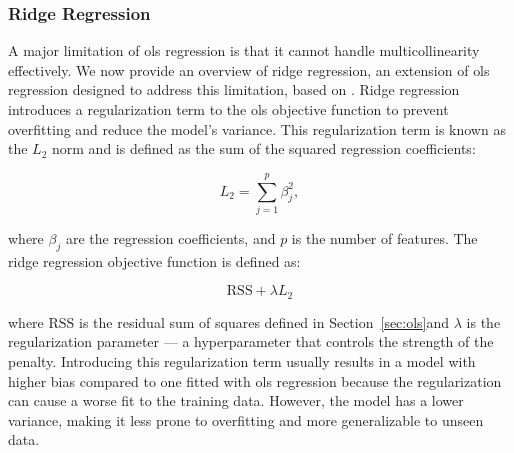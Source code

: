\subsubsection{Ridge Regression}
A major limitation of \gls{ols} regression is that it cannot handle multicollinearity effectively.
We now provide an overview of ridge regression, an extension of \gls{ols} regression designed to address this limitation, based on \citet{James2023AnIS}.
Ridge regression introduces a regularization term to the \gls{ols} objective function to prevent overfitting and reduce the model's variance.
This regularization term is known as the $L_2$ norm and is defined as the sum of the squared regression coefficients:

$$
L_2 = \sum_{j=1}^{p} \beta_j^2,
$$

where $\beta_j$ are the regression coefficients, and $p$ is the number of features.
The ridge regression objective function is defined as:

$$
\text{RSS} + \lambda L_2
$$

where $\text{RSS}$ is the residual sum of squares defined in Section~\ref{sec:ols}and $\lambda$ is the regularization parameter --- a hyperparameter that controls the strength of the penalty.
Introducing this regularization term usually results in a model with higher bias compared to one fitted with \gls{ols} regression because the regularization can cause a worse fit to the training data.
However, the model has a lower variance, making it less prone to overfitting and more generalizable to unseen data.
